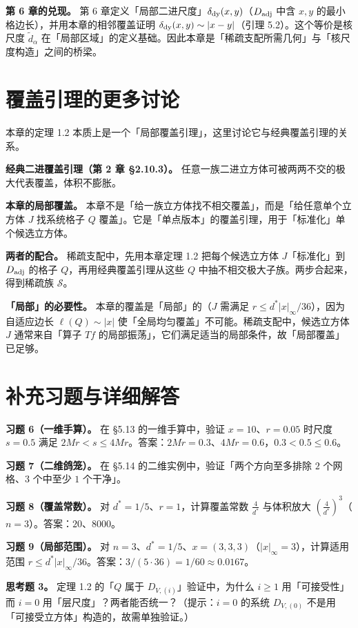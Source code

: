 \documentclass[a4paper,11pt,openany]{ctexbook}
\numberwithin{equation}{chapter}
\numberwithin{figure}{chapter}
\numberwithin{table}{chapter}
\begin{document}
\textbf{第 6 章的兑现。} 第 6 章定义「局部二进尺度」$\delta_{\rm dy}(x,y)$（$D_{\rm adj}$ 中含 $x,y$ 的最小格边长），并用本章的相邻覆盖证明 $\delta_{\rm dy}(x,y)\sim|x-y|$（引理 5.2）。这个等价是核尺度 $\widetilde d_\alpha$ 在「局部区域」的定义基础。因此本章是「稀疏支配所需几何」与「核尺度构造」之间的桥梁。

\section{覆盖引理的更多讨论}

本章的定理 1.2 本质上是一个「局部覆盖引理」，这里讨论它与经典覆盖引理的关系。

\textbf{经典二进覆盖引理（第 2 章 §2.10.3）。} 任意一族二进立方体可被两两不交的极大代表覆盖，体积不膨胀。

\textbf{本章的局部覆盖。} 本章不是「给一族立方体找不相交覆盖」，而是「给任意单个立方体 $J$ 找系统格子 $Q$ 覆盖」。它是「单点版本」的覆盖引理，用于「标准化」单个候选立方体。

\textbf{两者的配合。} 稀疏支配中，先用本章定理 1.2 把每个候选立方体 $J$「标准化」到 $D_{\rm adj}$ 的格子 $Q$，再用经典覆盖引理从这些 $Q$ 中抽不相交极大子族。两步合起来，得到稀疏族 $\mathcal S$。

\textbf{「局部」的必要性。} 本章的覆盖是「局部」的（$J$ 需满足 $r\le d^*|x|_\infty/36$），因为自适应边长 $\ell(Q)\sim|x|$ 使「全局均匀覆盖」不可能。稀疏支配中，候选立方体 $J$ 通常来自「算子 $Tf$ 的局部振荡」，它们满足适当的局部条件，故「局部覆盖」已足够。

\section{补充习题与详细解答}

\textbf{习题 6（一维手算）。} 在 §5.13 的一维手算中，验证 $x=10$、$r=0.05$ 时尺度 $s=0.5$ 满足 $2Mr<s\le4Mr$。答案：$2Mr=0.3$、$4Mr=0.6$，$0.3<0.5\le0.6$。

\textbf{习题 7（二维鸽笼）。} 在 §5.14 的二维实例中，验证「两个方向至多排除 $2$ 个网格、$3$ 个中至少 $1$ 个干净」。

\textbf{习题 8（覆盖常数）。} 对 $d^*=1/5$、$r=1$，计算覆盖常数 $\frac4{d^*}$ 与体积放大 $(\frac4{d^*})^3$（$n=3$）。答案：$20$、$8000$。

\textbf{习题 9（局部范围）。} 对 $n=3$、$d^*=1/5$、$x=(3,3,3)$（$|x|_\infty=3$），计算适用范围 $r\le d^*|x|_\infty/36$。答案：$3/(5\cdot36)=1/60\approx0.0167$。

\textbf{思考题 3。} 定理 1.2 的「$Q$ 属于 $D_{V,(i)}$」验证中，为什么 $i\ge1$ 用「可接受性」而 $i=0$ 用「层尺度」？两者能否统一？（提示：$i=0$ 的系统 $D_{V,(0)}$ 不是用「可接受立方体」构造的，故需单独验证。）
\end{document}
